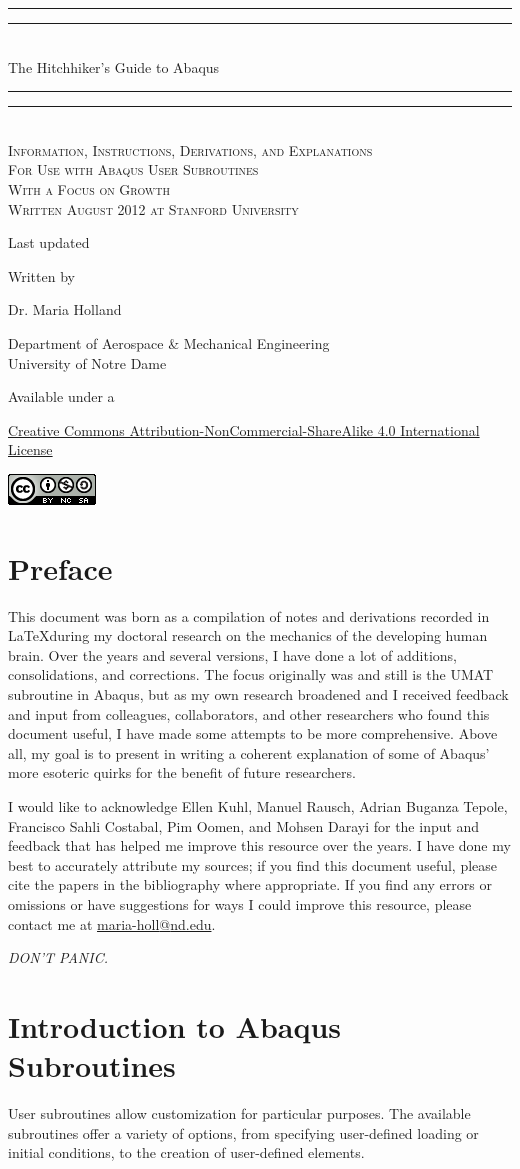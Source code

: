 \documentclass[10pt,letterpaper,oneside]{report}
\newcommand*{\titleGP}{\begingroup 
\thispagestyle{empty}
\centering

\vspace*{8\baselineskip} %
\rule{\textwidth}{1.6pt}\vspace*{-\baselineskip}\vspace*{2pt} 
\rule{\textwidth}{0.4pt}\\[\baselineskip] 
{\LARGE The Hitchhiker's Guide to Abaqus}\\[0.2\baselineskip] 
\rule{\textwidth}{0.4pt}\vspace*{-\baselineskip}\vspace{3.2pt} 
\rule{\textwidth}{1.6pt}\\[\baselineskip] %

\scshape
Information, Instructions, Derivations, and Explanations \\ 
For Use with Abaqus User Subroutines \\ 
With a Focus on Growth \\ [\baselineskip]
Written August 2012 at Stanford University \par  
Last updated \monthname \, \the\year

\vspace*{2\baselineskip} %

Written by \\[\baselineskip]
{\Large Dr. Maria Holland\par}
Department of Aerospace \& Mechanical Engineering \\ 
University of Notre Dame\par
\vspace*{2\baselineskip}
Available under a\par
\href{http://creativecommons.org/licenses/by-nc-sa/4.0/}{
Creative Commons Attribution-NonCommercial-ShareAlike 4.0 International License}

\includegraphics{CC_license.png}

\vfill

\endgroup}
\begin{document}
\titleGP 


\chapter*{Preface}
\thispagestyle{empty}

This document was born as a compilation of notes and derivations recorded in \LaTeX during my doctoral research on the mechanics of the developing human brain.  Over the years and several versions, I have done a lot of additions, consolidations, and corrections.  The focus originally was and still is the UMAT subroutine in Abaqus, but as my own research broadened and I received feedback and input from colleagues, collaborators, and other researchers who found this document useful, I have made some attempts to be more comprehensive.  Above all, my goal is to present in writing a coherent explanation of some of Abaqus' more esoteric quirks for the benefit of future researchers.

I would like to acknowledge Ellen Kuhl, Manuel Rausch, Adrian Buganza Tepole, Francisco Sahli Costabal, Pim Oomen, and Mohsen Darayi for the input and feedback that has helped me improve this resource over the years.  I have done my best to accurately attribute my sources; if you find this document useful, please cite the papers in the bibliography where appropriate.  If you find any errors or omissions or have suggestions for ways I could improve this resource, please contact me at \href{mailto:maria-holl@nd.edu}{maria-holl{\selectfont @}nd.edu}.

\vspace{0.5in}
\begin{center} 
\large{\emph{DON'T PANIC.}}
\end{center}


\newpage
\setcounter{tocdepth}{1}
\tableofcontents

\restoregeometry


\chapter{Introduction to Abaqus Subroutines}

User subroutines allow customization for particular purposes.  The available subroutines offer a variety of options, from specifying user-defined loading or initial conditions, to the creation of user-defined elements.  
\end{document}
